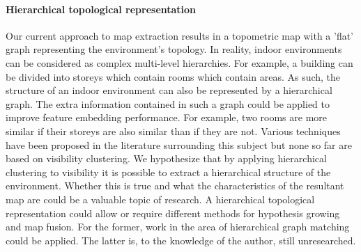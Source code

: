 \paragraph{Hierarchical topological representation}
Our current approach to map extraction results in a topometric map with a 'flat' graph representing the environment's topology. In reality, indoor environments can be considered as complex multi-level hierarchies. For example, a building can be divided into storeys which contain rooms which contain areas. As such, the structure of an indoor environment can also be represented by a hierarchical graph. The extra information contained in such a graph could be applied to improve feature embedding performance. For example, two rooms are more similar if their storeys are also similar than if they are not. Various techniques have been proposed in the literature surrounding this subject but none so far are based on visibility clustering. We hypothesize that by applying hierarchical clustering to visibility it is possible to extract a hierarchical structure of the environment. Whether this is true and what the characteristics of the resultant map are could be a valuable topic of research. A hierarchical topological representation could allow or require different methods for hypothesis growing and map fusion. For the former, work in the area of hierarchical graph matching could be applied. The latter is, to the knowledge of the author, still unresearched. 

